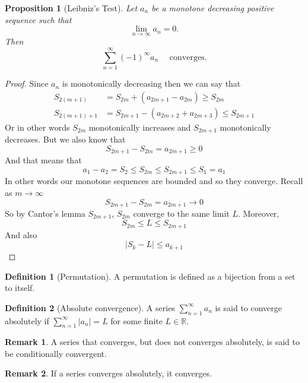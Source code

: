 \documentclass[11pt,a4paper]{article}
\theoremstyle{definition}
\newtheorem{definition}{Definition}[section]
\newtheorem{remark}{Remark}[section]
\theoremstyle{plain}
\newtheorem{proposition}[theorem]{Proposition}
\newcommand{\R}{\mathbb{R}}
\newcommand{\abs}[1]{\left\lvert #1\right\rvert}
\begin{document}
	\newpage
	
  \begin{proposition}[Leibniz's Test]
    Let $a_n$ be a monotone decreasing positive sequence such that
    \[
      \lim_{n\to\infty} a_n = 0.
    \]
    Then
    \[
      \sum_{n=1}^{\infty}(-1)^{\infty}{a_n} \quad \text{ converges}.
    \]
  \end{proposition}
  \begin{proof}
    Since $a_n$ is monotonically decreasing then we can say that
    \begin{align*}
      S_{2(m+1)} &= S_{2m} + (a_{2m+1} - a_{2m}) \ge S_{2m} \\
      S_{2(m+1)+1} &= S_{2m + 1} - (a_{2m+2} + a_{2m+3}) \le S_{2m + 1}
    \end{align*}
    Or in other words $S_{2m}$ monotonically increases and 
    $S_{2m+1}$  monotonically decreases. 
    But we also know that
    \[
      S_{2m+1} - S_{2m} =  a_{2m + 1} \ge 0
    \]
    And that means that
    \[
      a_1 - a_2 = S_2 \le S_{2m} \le S_{2m+1} \le S_1 = a_1
    \]
    In other words our monotone sequences are bounded and so they converge. 
    Recall as $m\to\infty$
    \[
      S_{2m + 1} - S_{2m} =  a_{2m + 1} \to 0
    \]
    So by Cantor's lemma $S_{2m+1}$, $S_{2m}$ converge to the same limit $L$.
    Moreover,
    \[
      S_{2m} \le L \le S_{2m + 1}
    \]
    And also
    \[
      \abs{S_k - L} \le a_{k + 1}
    \]
  \end{proof}
	
  \begin{definition}[Permutation]
    A permutation is defined as a bijection from a set to itself.
  \end{definition}

  \begin{definition}[Absolute convergence]
    A series $\sum_{n=1}^{\infty} a_n$ is said to converge absolutely 
    if $\sum_{n=1}^{\infty} \abs{a_n} = L$ for some finite $L \in \R$.
  \end{definition}
  \begin{remark}
    A series that converges, but does not converges absolutely, is said
    to be conditionally convergent.
  \end{remark}
  \begin{remark}
    If a series converges absolutely, it converges.
  \end{remark}
\end{document}
